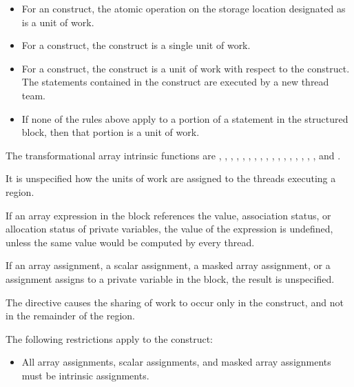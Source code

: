 \begin{fortranspecific}
\begin{itemize}
\item For an  construct, the atomic operation on the storage location designated as
 is a unit of work.

\item For a  construct, the construct is a single unit of work.

\item For a  construct, the construct is a unit of work with respect to the
 construct. The statements contained in the  construct are
executed by a new thread team.

\item If none of the rules above apply to a portion of a statement in the structured block,
then that portion is a unit of work.
\end{itemize}

The transformational array intrinsic functions are , , ,
, , , ,
, , , , ,
, , , , , and .

It is unspecified how the units of work are assigned to the threads executing a
 region.

If an array expression in the block references the value, association status, or allocation
status of private variables, the value of the expression is undefined, unless the same
value would be computed by every thread.

If an array assignment, a scalar assignment, a masked array assignment, or a 
assignment assigns to a private variable in the block, the result is unspecified.

The  directive causes the sharing of work to occur only in the 
construct, and not in the remainder of the  region.

{}

\begin{samepage}
\restrictions
The following restrictions apply to the  construct:

\begin{itemize}
\item All array assignments, scalar assignments, and masked array assignments must be
intrinsic assignments.


\end{itemize}
\end{samepage}
\end{fortranspecific}
